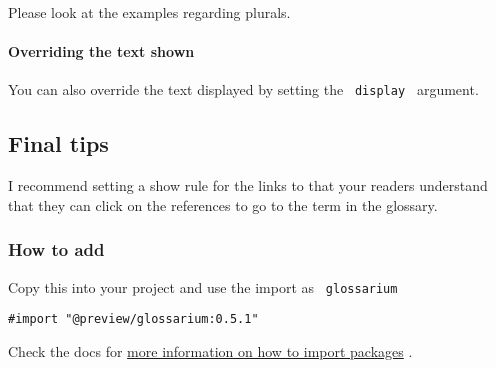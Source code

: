 \begin{Shaded}
\begin{Highlighting}[]
\end{Highlighting}
\end{Shaded}

Please look at the examples regarding plurals.

\paragraph{Overriding the text shown}\label{overriding-the-text-shown}

You can also override the text displayed by setting the
\texttt{\ display\ } argument.

\begin{Shaded}
\begin{Highlighting}[]
\end{Highlighting}
\end{Shaded}

\subsection{Final tips}\label{final-tips}

I recommend setting a show rule for the links to that your readers
understand that they can click on the references to go to the term in
the glossary.

\begin{Shaded}
\begin{Highlighting}[]
\end{Highlighting}
\end{Shaded}

\subsubsection{How to add}\label{how-to-add}

Copy this into your project and use the import as
\texttt{\ glossarium\ }

\begin{verbatim}
#import "@preview/glossarium:0.5.1"
\end{verbatim}



Check the docs for
\href{https://typst.app/docs/reference/scripting/\#packages}{more
information on how to import packages} .

